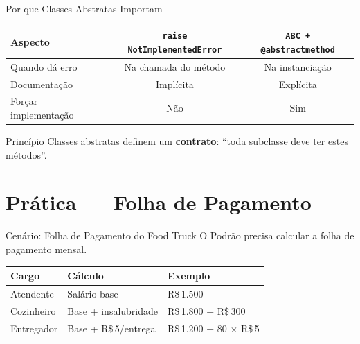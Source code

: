 \documentclass[aspectratio=169]{beamer}
\begin{document}
\begin{frame}{Por que Classes Abstratas Importam}
  \begin{center}
    \small
    \begin{tabular}{lcc}
      \toprule
      \textbf{Aspecto} & \texttt{raise NotImplementedError} & \texttt{ABC + @abstractmethod} \\
      \midrule
      Quando dá erro   & Na chamada do método & Na instanciação \\
      Documentação      & Implícita             & Explícita \\
      Forçar implementação & Não & Sim \\
      \bottomrule
    \end{tabular}
  \end{center}

  \begin{exampleblock}{Princípio}
    Classes abstratas definem um \textbf{contrato}: ``toda subclasse deve ter estes métodos''.
  \end{exampleblock}
\end{frame}

\section{Prática — Folha de Pagamento}

\begin{frame}{Cenário: Folha de Pagamento do Food Truck}
  O Podrão precisa calcular a folha de pagamento mensal.

  \bigskip

  \begin{center}
    \begin{tabular}{lll}
      \toprule
      \textbf{Cargo} & \textbf{Cálculo} & \textbf{Exemplo} \\
      \midrule
      Atendente   & Salário base              & R\$\,1.500 \\
      Cozinheiro  & Base + insalubridade      & R\$\,1.800 + R\$\,300 \\
      Entregador  & Base + R\$\,5/entrega     & R\$\,1.200 + 80 $\times$ R\$\,5 \\
      \bottomrule
    \end{tabular}
  \end{center}
\end{frame}
\end{document}

